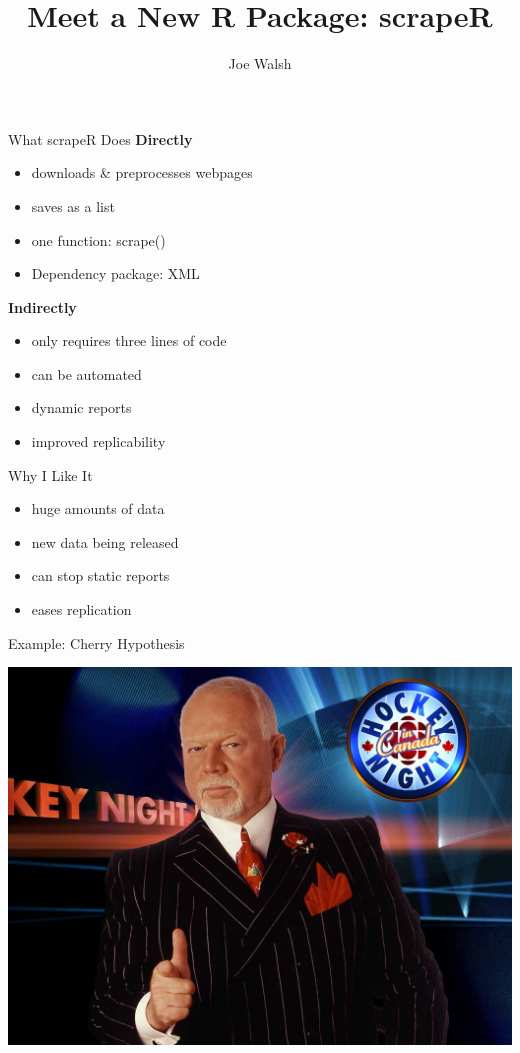 \documentclass{beamer}
\author{Joe Walsh}
\title{Meet a New R Package: scrapeR}
\begin{document}
\begin{frame}
  \titlepage
\end{frame}



\begin{frame}{What scrapeR Does}
  \textbf{Directly}

  \begin{itemize}
    \item downloads \& preprocesses webpages 
    \item saves as a list 
    \item one function: scrape() \pause 

    \bigskip
    \item Dependency package: XML \pause
    \end{itemize}

    \bigskip
    \textbf{Indirectly}
    \begin{itemize}
    \item only requires three lines of code  
    \item can be automated  
    \item dynamic reports 
    \item improved replicability 
  \end{itemize}
\end{frame}



\begin{frame}{Why I Like It}
  \begin{itemize}
    \item huge amounts of data
    \item new data being released
    \item can stop static reports
    \item eases replication
  \end{itemize}
\end{frame}






\begin{frame}{Example: Cherry Hypothesis}
  \begin{center}
    \includegraphics[scale=.3]{"Don Cherry"}
  \end{center}
\end{frame}
\end{document}
